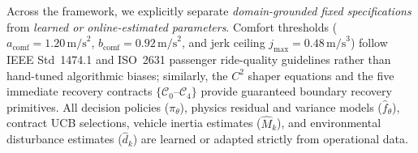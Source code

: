 \documentclass[10pt,a4paper]{article}
\begin{document}
Across the framework, we explicitly separate \emph{domain-grounded fixed specifications} from \emph{learned or online-estimated parameters}. Comfort thresholds ($a_{\text{comf}} = 1.20\,\text{m/s}^2$, $b_{\text{comf}} = 0.92\,\text{m/s}^2$, and jerk ceiling $j_{\max} = 0.48\,\text{m/s}^3$) follow IEEE Std~1474.1 and ISO~2631 passenger ride-quality guidelines rather than hand-tuned algorithmic biases; similarly, the $C^2$ shaper equations and the five immediate recovery contracts $\{\mathcal{C}_0\text{--}\mathcal{C}_4\}$ provide guaranteed boundary recovery primitives. All decision policies ($\pi_\theta$), physics residual and variance models ($\hat{f}_\theta$), contract UCB selections, vehicle inertia estimates ($\hat{M}_k$), and environmental disturbance estimates ($\hat{d}_k$) are learned or adapted strictly from operational data.
\end{document}
